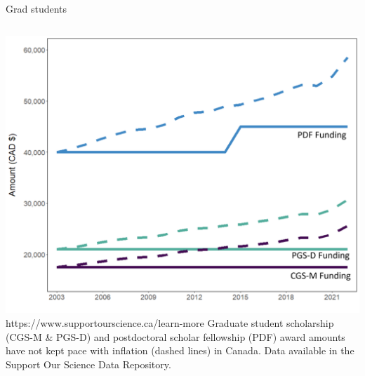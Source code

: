 \documentclass{beamer}
\begin{document}
\begin{frame}{Grad students}
	\begin{columns}
		\includegraphics[width=1\textwidth]{../images/gradfundingtime.png}
		\tiny{https://www.supportourscience.ca/learn-more}
		Graduate student scholarship (CGS-M \& PGS-D) and postdoctoral scholar fellowship (PDF) award amounts have not kept pace with inflation (dashed lines) in Canada. Data available in the Support Our Science Data Repository.
	\end{columns}
\end{frame}
\end{document}
